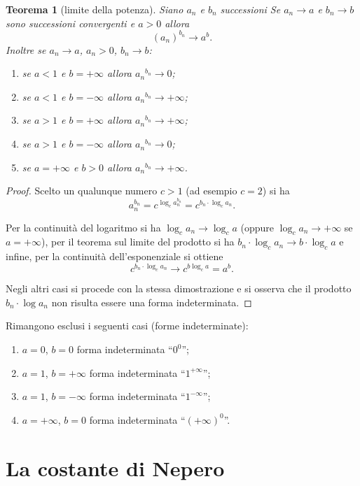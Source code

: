 \documentclass[italian,a4paper,oneside,headinclude]{scrbook}
\newtheorem{theorem}{Teorema}
\begin{document}
\begin{theorem}[limite della potenza]
Siano $a_n$ e $b_n$ successioni
Se $a_n\to a$ e $b_n \to b$
sono successioni convergenti e $a>0$
allora
\[
  (a_n)^{b_n} \to a^b.
\]
Inoltre se $a_n \to a$, $a_n>0$, $b_n \to b$:
\begin{enumerate}
\item se $a<1$ e $b=+\infty$ allora ${a_n}^{b_n} \to 0$;
\item se $a<1$ e $b=-\infty$ allora ${a_n}^{b_n} \to +\infty$;
\item se $a>1$ e $b=+\infty$ allora ${a_n}^{b_n} \to +\infty$;
\item se $a>1$ e $b=-\infty$ allora ${a_n}^{b_n} \to 0$;
\item se $a=+\infty$ e $b>0$ allora ${a_n}^{b_n} \to +\infty$.
\end{enumerate}

\end{theorem}
%
\begin{proof}
Scelto un qualunque numero $c>1$ (ad esempio $c=2$)
si ha
\[
  a_n^{b_n} = c^{\log_c a_n^{b_n}}
   = c^{b_n \cdot \log_c a_n}.
\]

Per la continuità del logaritmo si ha $\log_c a_n \to \log_c a$
(oppure $\log_c a_n \to +\infty$ se $a=+\infty$),
per il teorema sul limite del prodotto si ha $b_n\cdot \log_c a_n \to b\cdot \log_c a$
e infine, per la continuità dell'esponenziale si ottiene
\[
  c^{b_n \cdot \log_c a_n} \to c^{b\log_c a} = a^b.
\]

Negli altri casi si procede con la stessa dimostrazione
e si osserva che il prodotto $b_n \cdot \log a_n$ non risulta essere
una forma indeterminata.
\end{proof}

Rimangono esclusi i seguenti casi (forme indeterminate):
\begin{enumerate}
\item $a=0$, $b=0$ forma indeterminata ``$0^0$'';
\item $a=1$, $b=+\infty$ forma indeterminata ``$1^{+\infty}$'';
\item $a=1$, $b=-\infty$ forma indeterminata ``$1^{-\infty}$'';
\item $a=+\infty$, $b=0$ forma indeterminata ``$(+\infty)^0$''.
\end{enumerate}

\section{La costante di Nepero}
\end{document}
